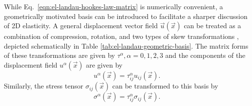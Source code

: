 While Eq.~\ref{eqn:el-landau-hookes-law-matrix} is numerically convenient, a geometrically motivated basis can be introduced to facilitate a sharper discussion of 2D elasticity.  A general displacement vector field $\vec{u}(\vec{x})$ can be treated as a combination of compression, rotation, and two types of skew transformations \cite{scheibner2020odd}, depicted schematically in Table \ref{tab:el-landau-geometric-basis}.  The matrix forms of these transformations are given by $\tau^\alpha, \alpha = 0, 1, 2, 3$ and the components of the displacement field $u^\alpha(\vec{x})$ are given by
%
\begin{equation}
u^\alpha(\vec{x}) = \tau_{ij}^\alpha u_{ij}(\vec{x}).
\end{equation}
%
Similarly, the stress tensor $\sigma_{ij}(\vec{x})$ can be transformed to this basis by
%
\begin{equation}
\sigma^\alpha(\vec{x}) = \tau_{ij}^\alpha \sigma_{ij}(\vec{x}).
\end{equation}

